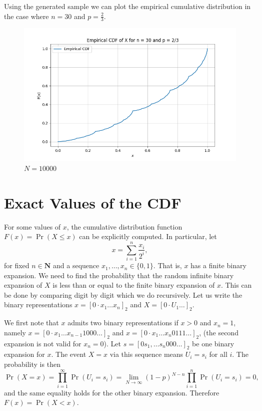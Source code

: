 \documentclass{article}
\begin{document}
Using the generated sample we can plot the empirical cumulative distribution in the case where \(n = 30\) and \(p = \frac{2}{3}\).

\begin{figure}
    \centering
    \includegraphics[width=1.0\linewidth]{images/empirical.png}
    \caption{\(N = 10000\)}
\end{figure}

\section{Exact Values of the CDF}

For some values of \(x\), the cumulative distribution function \(F(x) = \Pr(X \leq x)\) can be explicitly computed. In particular, let 
\[x = \sum_{i=1}^n \frac{x_i}{2^i}, \]
for fixed \(n \in \mathbf{N}\) and a sequence \(x_1, \dots, x_n \in \{0,1\}\). That is, \(x\) has a finite binary expansion. We need to find the probability that the random infinite binary expansion of \(X\) is less than or equal to the finite binary expansion of \(x\). This can be done by comparing digit by digit which we do recursively. Let us write the binary representations \(x = [0 \cdot x_1 \dots x_n]_2\) and \(X = [0 \cdot U_1 \dots]_2\).

We first note that \(x\) admits two binary representations if \(x > 0\) and \(x_n = 1\), namely \(x = [0 \cdot x_1 \dots x_{n-1}1000\dots]_2\) and \(x = [0 \cdot x_1 \dots x_n0111\dots]_2\), (the second expansion is not valid for \(x_n = 0\)). Let \(s = [0s_1, \dots s_n000\dots]_2\) be one binary expansion for \(x\). The event \(X = x\) via this sequence means \(U_i = s_i\) for all \(i\). The probability is then
\[ \Pr(X = x) = \prod_{i=1}^\infty \Pr(U_i = s_i) = \lim_{N \to \infty} (1-p)^{N-n} \prod_{i=1}^n \Pr(U_i = s_i) = 0, \]
and the same equality holds for the other binary expansion. Therefore \(F(x) = \Pr(X < x)\).
\end{document}
